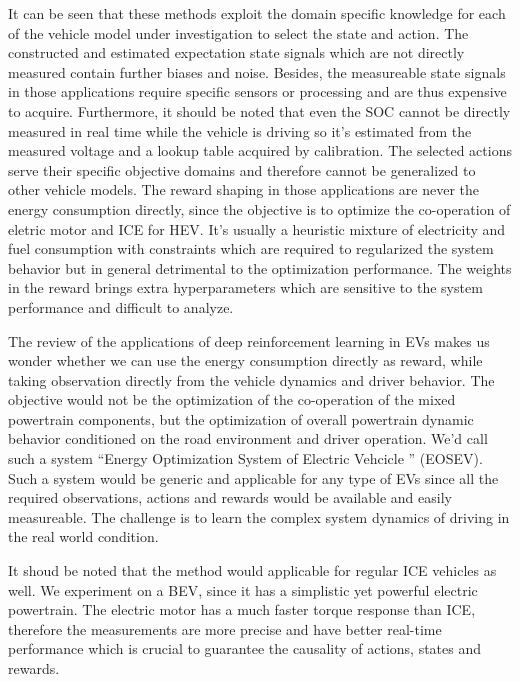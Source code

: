 \documentclass[conference]{IEEEtran}
\begin{document}
It can be seen that these methods exploit the domain specific knowledge for each of the vehicle model under investigation to select the state and action. The constructed and estimated expectation state signals which are not directly measured contain further biases and noise. Besides, the measureable state signals in those applications require specific sensors or processing and are thus expensive to acquire. Furthermore, it should be noted that even the SOC cannot be directly measured in real time while the vehicle is driving so it's estimated from the measured voltage and a lookup table acquired by calibration. The selected actions serve their specific objective domains and therefore cannot be generalized to other vehicle models. The reward shaping in those applications are never the energy consumption directly, since the objective is to optimize the co-operation of eletric motor and ICE for HEV\@. It's usually a heuristic mixture of electricity and fuel consumption with constraints which are required to regularized the system behavior but in general detrimental to the optimization performance. The weights in the reward brings extra hyperparameters which are sensitive to the system performance and difficult to analyze.

The review of the applications of deep reinforcement learning in EVs makes us wonder whether we can use the energy consumption directly as reward, while taking observation directly from the vehicle dynamics and driver behavior. The objective would not be the optimization of the co-operation of the mixed powertrain components, but the optimization of overall powertrain dynamic behavior conditioned on the road environment and driver operation. We'd call such a system ``Energy Optimization System of Electric Vehcicle '' (EOSEV). Such a system would be generic and applicable for any type of EVs since all the required observations, actions and rewards would be available and easily measureable. The challenge is to learn the complex system dynamics of driving in the real world condition.

It shoud be noted that the method would applicable for regular ICE vehicles as well. We experiment on a BEV, since it has a simplistic yet powerful electric powertrain. The electric motor has a much faster torque response than ICE, therefore the measurements are more precise and have better real-time performance which is crucial to guarantee the causality of actions, states and rewards.
\end{document}
